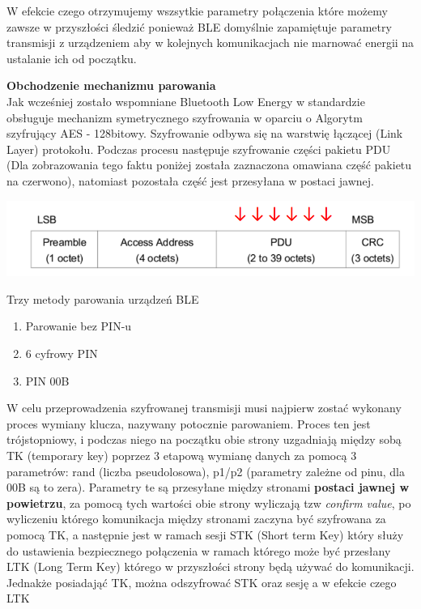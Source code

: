 W efekcie czego otrzymujemy wszsytkie parametry połączenia które możemy zawsze w przyszłości śledzić ponieważ BLE domyślnie zapamiętuje parametry transmisji z urządzeniem aby w kolejnych komunikacjach nie marnować energii na ustalanie ich od początku. \\

\par
\tab \textbf{Obchodzenie mechanizmu parowania} \\
Jak wcześniej zostało wspomniane Bluetooth Low Energy w standardzie obsługuje mechanizm symetrycznego szyfrowania w oparciu o Algorytm szyfrujący AES - 128bitowy. Szyfrowanie odbywa się na warstwię łączącej (Link Layer) protokołu. Podczas procesu następuje szyfrowanie części pakietu PDU (Dla zobrazowania tego faktu poniżej została zaznaczona omawiana część pakietu na czerwono), natomiast pozostała część jest przesyłana w postaci jawnej.

\centerline{
	\includegraphics[scale=0.35]{./img/AES_PDU_crypt.png}
}
Trzy metody parowania urządzeń BLE
\begin{enumerate}
	\item Parowanie bez PIN-u
	\item 6 cyfrowy PIN
	\item PIN 00B	
\end{enumerate} 

\tab W celu przeprowadzenia szyfrowanej transmisji musi najpierw zostać wykonany proces wymiany klucza, nazywany potocznie parowaniem. Proces ten jest trójstopniowy, i podczas niego na początku obie strony uzgadniają między sobą TK (temporary key) poprzez 3 etapową wymianę danych za pomocą 3 parametrów: rand (liczba pseudolosowa), p1/p2 (parametry zależne od pinu, dla 00B są to zera). Parametry te są przesyłane między stronami \textbf{postaci jawnej w powietrzu}, za pomocą tych wartości obie strony wyliczają tzw \textit{confirm value}, po wyliczeniu którego komunikacja między stronami zaczyna być szyfrowana za pomocą TK, a następnie jest w ramach sesji STK (Short term Key) który służy do ustawienia bezpiecznego połączenia w ramach którego może być przesłany LTK (Long Term Key) którego w przyszłości strony będą używać do komunikacji.
Jednakże posiadająć TK, można odszyfrować STK oraz sesję a w efekcie czego LTK

